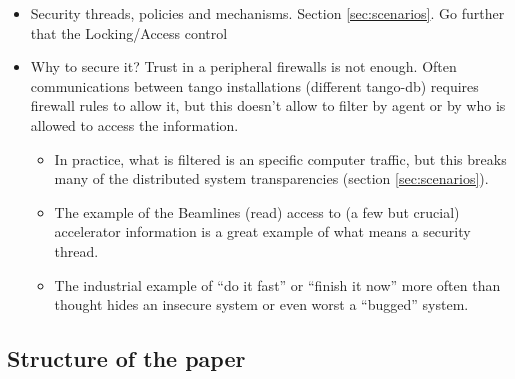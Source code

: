 \documentclass[10pt,a4paper,twoside]{llncs}
\begin{document}
\begin{itemize}
    \item Security threads, policies and mechanisms. Section \ref{sec:scenarios}. Go further that the Locking/Access control
    \item Why to secure it? Trust in a peripheral firewalls is not enough. Often communications between tango installations (different tango-db) requires firewall rules to allow it, but this doesn't allow to filter by agent or by who is allowed to access the information.
    \begin{itemize}
        \item In practice, what is filtered is an specific computer traffic, but this breaks many of the distributed system transparencies (section \ref{sec:scenarios}).
        \item The example of the Beamlines (read) access to (a few but crucial) accelerator information is a great example of what means a security thread.
        \item The industrial example of ``do it fast'' or ``finish it now'' more often than thought hides an insecure system or even worst a ``bugged'' system. 
    \end{itemize}
\end{itemize}

%
\subsection{Structure of the paper \label{sec:structurePaper}}
\end{document}
